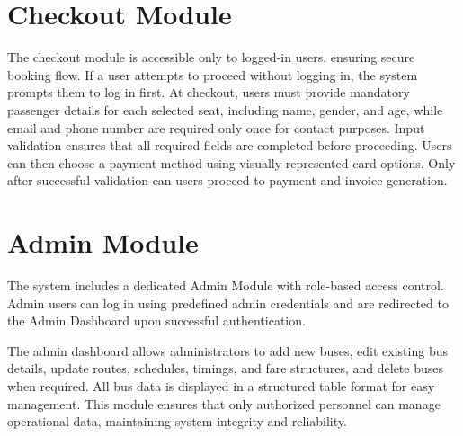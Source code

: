 \section{Checkout Module}

The checkout module is accessible only to logged-in users, ensuring secure booking flow. If a user attempts to proceed without logging in, the system prompts them to log in first. At checkout, users must provide mandatory passenger details for each selected seat, including name, gender, and age, while email and phone number are required only once for contact purposes. Input validation ensures that all required fields are completed before proceeding. Users can then choose a payment method using visually represented card options. Only after successful validation can users proceed to payment and invoice generation.

\section{Admin Module}

The system includes a dedicated Admin Module with role-based access control. Admin users can log in using predefined admin credentials and are redirected to the Admin Dashboard upon successful authentication. 

The admin dashboard allows administrators to add new buses, edit existing bus details, update routes, schedules, timings, and fare structures, and delete buses when required. All bus data is displayed in a structured table format for easy management. This module ensures that only authorized personnel can manage operational data, maintaining system integrity and reliability.
